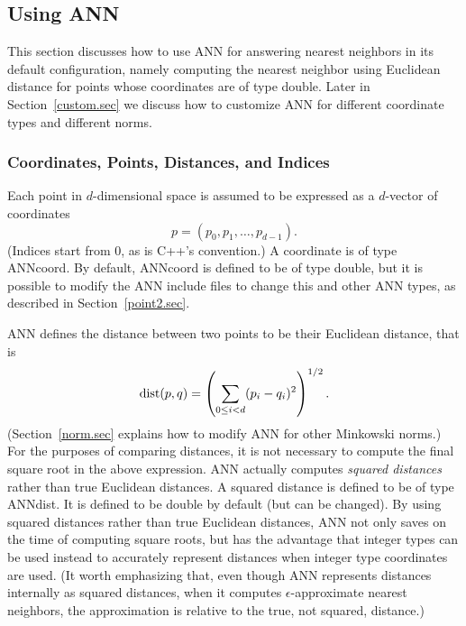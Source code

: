 \documentclass[11pt]{article}		%
\newcommand{\ANN}[0]{\textsf{ANN}}
\newcommand{\dist}[0]{{\rm dist}}
\begin{document}
\subsection{Using {\ANN}}\label{using.sec}

This section discusses how to use {\ANN} for answering nearest neighbors
in its default configuration, namely computing the nearest neighbor
using Euclidean distance for points whose coordinates are of type
\textsf{double}.  Later in Section~\ref{custom.sec} we discuss how to
customize {\ANN} for different coordinate types and different norms.

\subsubsection{Coordinates, Points, Distances, and Indices}\label{point.sec}

Each point in $d$-dimensional space is assumed to be expressed as a
$d$-vector of coordinates
\[
	p = (p_0, p_1, \ldots, p_{d-1}).
\]
(Indices start from 0, as is C++'s convention.)  A coordinate is of type
\textsf{ANNcoord}.  By default, \textsf{ANNcoord} is defined to be of
type \textsf{double}, but it is possible to modify the {\ANN} include
files to change this and other {\ANN} types, as described in
Section~\ref{point2.sec}.

{\ANN} defines the distance between two points to be their Euclidean
distance, that is
\[
    \dist(p,q) = \left(\sum_{0 \le i < d} (p_i-q_i)^2 \right)^{1/2}.
\]
(Section~\ref{norm.sec} explains how to modify {\ANN} for other
Minkowski norms.)  For the purposes of comparing distances, it is not
necessary to compute the final square root in the above expression.
{\ANN} actually computes \emph{squared distances} rather than true
Euclidean distances.  A squared distance is defined to be of type
\textsf{ANNdist}.  It is defined to be \textsf{double} by default (but
can be changed).  By using squared distances rather than true Euclidean
distances, {\ANN} not only saves on the time of computing square roots,
but has the advantage that integer types can be used instead to
accurately represent distances when integer type coordinates are used.
(It worth emphasizing that, even though {\ANN} represents distances
internally as squared distances, when it computes $\epsilon$-approximate
nearest neighbors, the approximation is relative to the true, not
squared, distance.)
\end{document}
